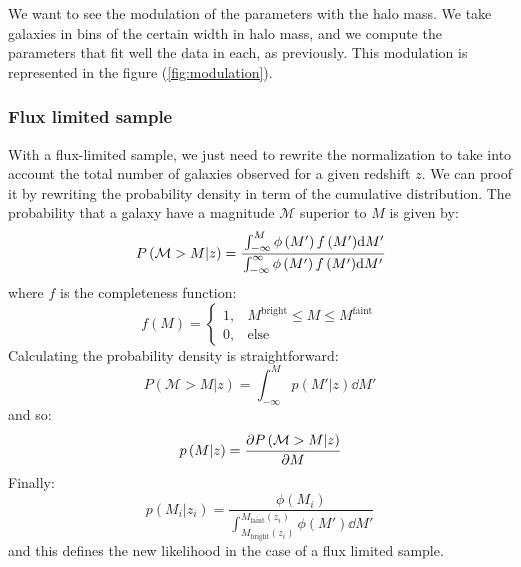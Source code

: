 We want to see the modulation of the parameters with the halo mass. We take
galaxies in bins of the certain width in halo mass, and we compute the
parameters that fit well the data in each, as previously. This modulation is
represented in the figure (\ref{fig:modulation}).
%
\subsubsection{Flux limited sample}
%
With a flux-limited sample, we just need to rewrite the normalization to
take into account the total number of galaxies observed for a given redshift
$z$. We can proof it by rewriting the probability density in term of the
cumulative distribution. The probability that a galaxy have a magnitude
$\mathcal{M}$ superior to $M$ is given by:
%
\begin{equation}\label{eq:cumprobfluxlim}
    P\left(\mathcal{M}>M|z\right)=\cfrac{\int_{-\infty}^M{\phi\left({M'}\right){f\left({M'}\right)}{\rm{d}}{M'}}}
    {\int_{-\infty}^{\infty}{\phi\left({M'}\right){f\left({M'}\right)}{\rm{d}}{M'}}}
\end{equation}
%
where $f$ is the completeness function:
%
\begin{equation}
    f\left(M\right) = \begin{cases}
        1, &M^\mathrm{bright}\leq M \leq M^\mathrm{faint} \\
        0, & \mbox{else}
        \end{cases}
\end{equation}
%
Calculating the probability density is straightforward:
%
\begin{equation}
    P\left(\mathcal{M}>M|z\right)=\int_{-\infty}^M{p\left(M'|z\right)}\dd{M'}
\end{equation}
%
and so:
%
\begin{equation}
    p\left(M|z\right)=\cfrac{{\partial} P\left(\mathcal{M}>M|z\right)}{{\partial} M}
\end{equation}
%
Finally:
%
\begin{equation}
    p\left(M_i|z_i\right)=\dfrac{\phi\left({M_i}\right)}{\int_{M_{\mathrm{bright}}\left({z_i}\right)}^{M_{\mathrm{faint}}\left({z_i}\right)}
    {\phi\left({M'}\right)\dd{M'}}}
\end{equation}
%
and this defines the new likelihood in the case of a flux limited sample.

